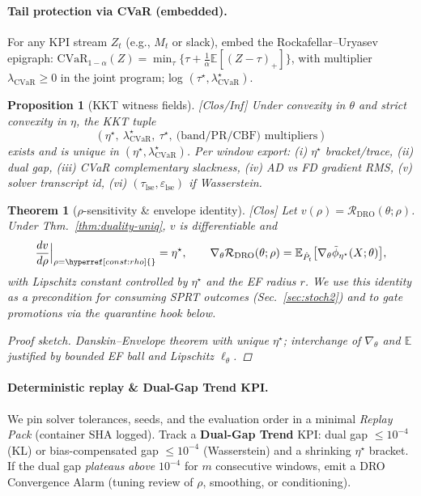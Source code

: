\documentclass[10pt]{article}
\newenvironment{proofsketch}{\begin{proof}[Proof sketch]}{\end{proof}}
\newcommand{\layertag}[1]{\textup{[#1]}}
\newcommand{\constref}[1]{\hyperref[const:#1]{\ensuremath{\csname constsym#1\endcsname}}}
\newtheorem{theorem}{Theorem}
\newtheorem{proposition}{Proposition}
\begin{document}
\paragraph{Tail protection via CVaR (embedded).}
For any KPI stream $Z_t$ (e.g., $M_t$ or slack), embed the Rockafellar–Uryasev epigraph:
$\mathrm{CVaR}_{1-\alpha}(Z)=\min_{\tau}\{\tau+\tfrac{1}{\alpha}\mathbb E[(Z-\tau)_+]\}$,
with multiplier $\lambda_{\mathrm{CVaR}}\!\ge\!0$ in the joint program; log $(\tau^\star,\lambda_{\mathrm{CVaR}}^\star)$.

\begin{proposition}[KKT witness fields]\label{prop:kkt-ops2}
\emph{\layertag{Clos/Inf}}
Under convexity in $\theta$ and strict convexity in $\eta$, the KKT tuple
\[
\left(\eta^\star,\ \lambda_{\mathrm{CVaR}}^\star,\ \tau^\star,\ \text{(band/PR/CBF) multipliers}\right)
\]
exists and is unique in $(\eta^\star,\lambda_{\mathrm{CVaR}}^\star)$.
Per window export: (i) $\eta^\star$ bracket/trace, (ii) dual gap, (iii) CVaR complementary slackness, (iv) AD vs FD gradient RMS, (v) solver transcript id, (vi) $(\tau_{\mathrm{lse}},\varepsilon_{\mathrm{lse}})$ if Wasserstein.
\end{proposition}

\begin{theorem}[$\rho$-sensitivity \& envelope identity]\label{thm:rho-sense}
\emph{\layertag{Clos}}
Let $v(\rho)=\mathcal R_{\mathrm{DRO}}(\theta;\rho)$. Under Thm.~\ref{thm:duality-uniq}, $v$ is differentiable and
\[
\frac{dv}{d\rho}\Big|_{\rho=\constref{rho}}=\eta^\star,
\qquad
\nabla_\theta \mathcal R_{\mathrm{DRO}}(\theta;\rho) = \mathbb E_{\hat P_t}\big[\nabla_\theta \tilde\phi_{\eta^\star}(X;\theta)\big],
\]
with Lipschitz constant controlled by $\eta^\star$ and the EF radius $r$.
We use this identity \emph{as a precondition} for consuming SPRT outcomes (Sec.~\ref{sec:stoch2}) and to gate promotions via the quarantine hook below.
\begin{proofsketch}
Danskin–Envelope theorem with unique $\eta^\star$; interchange of $\nabla_\theta$ and $\mathbb E$ justified by bounded EF ball and Lipschitz $\ell_\theta$.
\end{proofsketch}
\end{theorem}

\paragraph{Deterministic replay \& Dual-Gap Trend KPI.}
We pin solver tolerances, seeds, and the evaluation order in a minimal \emph{Replay Pack} (container SHA logged).
Track a \textbf{Dual-Gap Trend} KPI: dual gap $\le 10^{-4}$ (KL) or bias-compensated gap $\le 10^{-4}$ (Wasserstein) and a shrinking $\eta^\star$ bracket. If the dual gap \emph{plateaus above} $10^{-4}$ for $m$ consecutive windows, emit a \textsf{DRO Convergence Alarm} (tuning review of $\rho$, smoothing, or conditioning).
\end{document}
